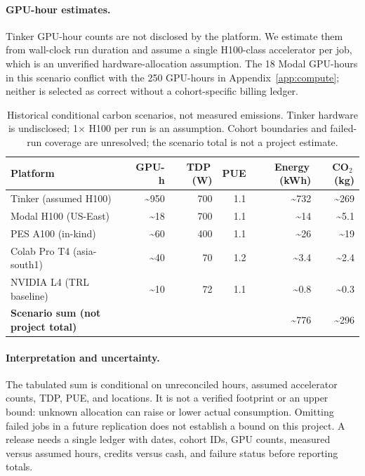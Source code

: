 \paragraph{GPU-hour estimates.}
Tinker GPU-hour counts are not disclosed by the platform. We estimate them
from wall-clock run duration and assume a single H100-class accelerator per
job, which is an unverified hardware-allocation assumption. The 18 Modal GPU-hours
in this scenario conflict with the 250 GPU-hours in Appendix~\ref{app:compute};
neither is selected as correct without a cohort-specific billing ledger.

\begin{table}[ht]
\centering
\small
\caption{Historical conditional carbon scenarios, not measured emissions. Tinker hardware
is undisclosed; 1$\times$ H100 per run is an assumption. Cohort boundaries and
failed-run coverage are unresolved; the scenario total is not a project estimate.}
\label{tab:carbon2}
\begin{tabular}{lrrrrr}
\toprule
\textbf{Platform} & \textbf{GPU-h} & \textbf{TDP\,(W)} & \textbf{PUE} &
\textbf{Energy\,(kWh)} & \textbf{CO$_2$\,(kg)} \\
\midrule
Tinker (assumed H100)   & \textasciitilde 950 & 700 & 1.1 & \textasciitilde 732 & \textasciitilde 269 \\
Modal H100 (US-East)    & \textasciitilde 18  & 700 & 1.1 & \textasciitilde 14  & \textasciitilde 5.1 \\
PES A100 (in-kind)      & \textasciitilde 60  & 400 & 1.1 & \textasciitilde 26  & \textasciitilde 19   \\
Colab Pro T4 (asia-south1) & \textasciitilde 40 & 70 & 1.2 & \textasciitilde 3.4 & \textasciitilde 2.4  \\
NVIDIA L4 (TRL baseline)   & \textasciitilde 10 & 72 & 1.1 & \textasciitilde 0.8 & \textasciitilde 0.3  \\
\midrule
\textbf{Scenario sum (not project total)} & & & & \textasciitilde 776 & \textasciitilde 296 \\
\bottomrule
\end{tabular}
\end{table}

\paragraph{Interpretation and uncertainty.}
The tabulated sum is conditional on unreconciled hours, assumed accelerator
counts, TDP, PUE, and locations. It is not a verified footprint or an upper bound:
unknown allocation can raise or lower actual consumption. Omitting failed jobs
in a future replication does not establish a bound on this project. A release
needs a single ledger with dates, cohort IDs, GPU counts, measured versus assumed
hours, credits versus cash, and failure status before reporting totals.

